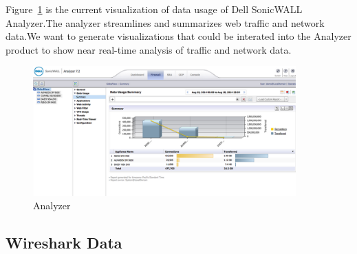 \documentclass[paper=a4, fontsize=11pt]{report} %
\begin{document}
\begin{description}[style=nextline]
    \item[\href{http://www.sonicwall.com/us/en/products/Firewall-Analyzer.html}{Analyzer}]
    Figure~\ref{fig:analyzer} is the current visualization of data usage of Dell SonicWALL Analyzer.The analyzer streamlines and summarizes web traffic and network data.We want to generate visualizations that could be interated into the Analyzer product to show near real-time analysis of traffic and network data.
    \begin{figure}[H]
        \begin{center}
            \includegraphics[width=0.9\textwidth]{analyzer.png}
        \end{center}
        \caption{Analyzer}\label{fig:analyzer}
    \end{figure}

\end{description}

\subsection{Wireshark Data} %
\label{sub:wireshark_data}
\end{document}
